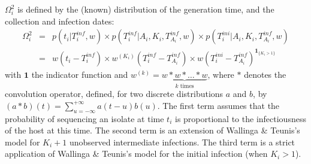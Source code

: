 \documentclass[10pt]{article}
\begin{document}
$\Omega_i^2$ is defined by the (known) distribution of the generation time, and the collection and infection dates:
\begin{eqnarray}
 \Omega_i^2 & = & p(t_i | T_i^{inf}, w) \times p(T_i^{inf}| A_i, K_i,T_{A_i}^{inf}, w) \times p(T_i^{ini}| A_i, K_i, T_{A_i}^{inf}, w) \nonumber \\
& = &  w(t_i - T_i^{inf}) \times  w^{\left(K_i\right)}(T_i^{inf} - T_{A_i}^{inf}) \times w(T_i^{ini} - T_{A_i}^{inf})^{\mathbf{1}_{\{K_i>1\}}}
\end{eqnarray}
with $\mathbf{1}$ the indicator function and $w^{\left(k\right)} = \underbrace{w*w*\ldots*w}_{k \text{ times}} $, where $*$ denotes the convolution operator, defined, for two discrete distributions $a$ and $b$, by $\left(a*b\right)\left(t\right) = \sum_{u=-\infty}^{+\infty} a\left(t-u\right)b\left(u\right)$.
The first term assumes that the probability of sequencing an isolate at time $t_i$ is proportional to the infectiousness of the host at this time.
The second term is an extension of Wallinga \& Teunis's model for $K_i+1$ unobserved intermediate infections.
The third term is a strict application of Wallinga \& Teunis's model for the initial infection (when $K_i>1$).
\\
\end{document}

